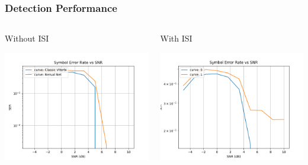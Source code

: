 \documentclass[10pt,tgadventor, onlymath]{beamer}
\begin{document}
\begin{frame}
\frametitle{Detection Performance}
\begin{columns}
\begin{column}{0.5\linewidth}
	Without ISI

	\includegraphics[width=\textwidth]{no_isi}
\end{column}
\begin{column}{0.5\linewidth}
	With ISI

	\includegraphics[width=\textwidth]{without_mm}

\end{column}
\end{columns}
\end{frame}
\end{document}
